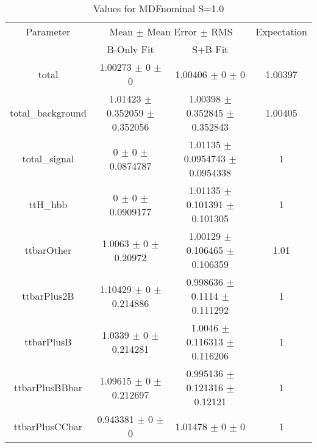 \begin{table}
\centering
\caption{Values for MDFnominal S=1.0}
\begin{tabular}{cccc}
\toprule
Parameter & \multicolumn{2}{c}{Mean $\pm$ Mean Error $\pm$ RMS} & Expectation\\
 & B-Only Fit & S+B Fit & \\
\midrule
total & \num{1.00273} $\pm$ \num{0} $\pm$ \num{0} & \num{1.00406} $\pm$ \num{0} $\pm$ \num{0} & \num{1.00397}\\
total\_background & \num{1.01423} $\pm$ \num{0.352059} $\pm$ \num{0.352056} & \num{1.00398} $\pm$ \num{0.352845} $\pm$ \num{0.352843} & \num{1.00405}\\
total\_signal & \num{0} $\pm$ \num{0} $\pm$ \num{0.0874787} & \num{1.01135} $\pm$ \num{0.0954743} $\pm$ \num{0.0954338} & \num{1}\\
ttH\_hbb & \num{0} $\pm$ \num{0} $\pm$ \num{0.0909177} & \num{1.01135} $\pm$ \num{0.101391} $\pm$ \num{0.101305} & \num{1}\\
ttbarOther & \num{1.0063} $\pm$ \num{0} $\pm$ \num{0.20972} & \num{1.00129} $\pm$ \num{0.106465} $\pm$ \num{0.106359} & \num{1.01}\\
ttbarPlus2B & \num{1.10429} $\pm$ \num{0} $\pm$ \num{0.214886} & \num{0.998636} $\pm$ \num{0.1114} $\pm$ \num{0.111292} & \num{1}\\
ttbarPlusB & \num{1.0339} $\pm$ \num{0} $\pm$ \num{0.214281} & \num{1.0046} $\pm$ \num{0.116313} $\pm$ \num{0.116206} & \num{1}\\
ttbarPlusBBbar & \num{1.09615} $\pm$ \num{0} $\pm$ \num{0.212697} & \num{0.995136} $\pm$ \num{0.121316} $\pm$ \num{0.12121} & \num{1}\\
ttbarPlusCCbar & \num{0.943381} $\pm$ \num{0} $\pm$ \num{0} & \num{1.01478} $\pm$ \num{0} $\pm$ \num{0} & \num{1}\\
\bottomrule
\end{tabular}
\end{table}